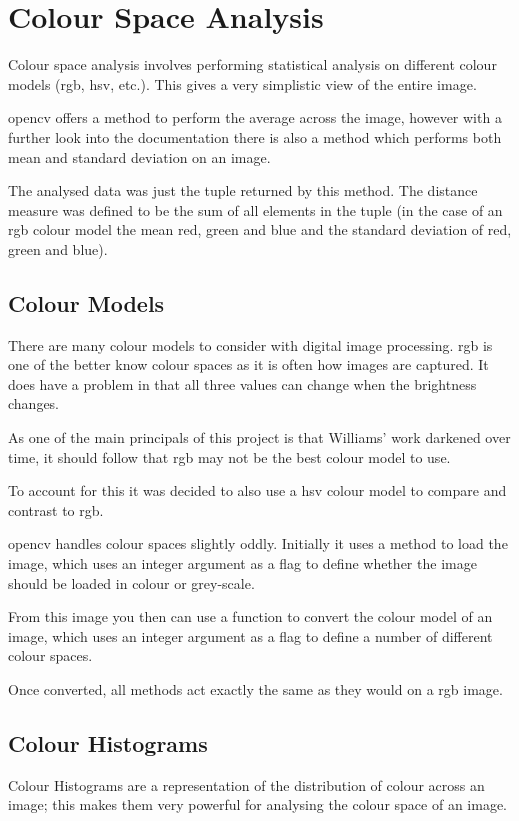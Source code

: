 \section{Colour Space Analysis}
Colour space analysis involves performing statistical analysis on different colour models 
(\gls{rgb}, \gls{hsv}, etc.). This gives a very simplistic view of the entire image.

\gls{opencv} offers a method to perform the average across the image, however with a
further look into the documentation there is also a method which performs both 
mean and standard deviation on an image.

The analysed data was just the tuple returned by this method. The distance measure
was defined to be the sum of all elements in the tuple (in the case of an \gls{rgb} colour model
the mean red, green and blue and the standard deviation of red, green and blue).

\subsection{Colour Models}
There are many colour models to consider with digital image processing. \Gls{rgb} is one of the
better know colour spaces as it is often how images are captured. It does have a problem in that
all three values can change when the brightness changes.

As one of the main principals of this project is that Williams' work darkened over time, it
should follow that \gls{rgb} may not be the best colour model to use.

To account for this it was decided to also use a \gls{hsv} colour model to compare and contrast to
\gls{rgb}.

\gls{opencv} handles colour spaces slightly oddly. Initially it uses a method to load the 
image, which uses an integer argument as a flag to define whether the image should be loaded in 
colour or grey-scale.

From this image you then can use a function to convert the colour model of an image, which 
uses an integer argument as a flag to define a number of different colour spaces.

Once converted, all methods act exactly the same as they would on a \gls{rgb} image.

\subsection{Colour Histograms}
Colour Histograms are a representation of the distribution of colour across an image; this makes
them very powerful for analysing the colour space of an image.

